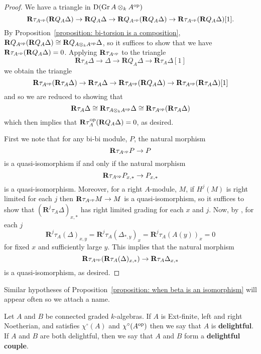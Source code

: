 \begin{proof}
  We have a triangle in \(\mathrm{D}(\operatorname{Gr}A \otimes_k A^{\operatorname{op}})\)
  \[\mathbf{R}\tau_{A^{\operatorname{op}}} (\mathbf{R}Q_A \Delta) \to \mathbf{R}Q_A \Delta \to \mathbf{R}Q_{A^{\operatorname{op}}} (\mathbf{R}Q_A \Delta) \to \mathbf{R}\tau_{A^{\operatorname{op}}} (\mathbf{R}Q_A \Delta)[1].\]
  By Proposition~\ref{proposition: bi-torsion is a composition}, \(\mathbf{R}Q_{A^{\operatorname{op}}}(\mathbf{R}Q_A \Delta) \cong \mathbf{R}Q_{A \otimes_k A^{\operatorname{op}}} \Delta\), so it suffices to show that we have \(\mathbf{R}\tau_{A^{\operatorname{op}}}(\mathbf{R}Q_A \Delta) = 0\).
  Applying \(\mathbf{R}\tau_{A^{\operatorname{op}}}\) to the triangle
  \[\mathbf{R}\tau_A \Delta \to \Delta \to \mathbf{R}Q_A \Delta \to \mathbf{R}\tau_A \Delta[1]\]
  we obtain the triangle
  \[\mathbf{R}\tau_{A^{\operatorname{op}}} (\mathbf{R}\tau_A \Delta) \to \mathbf{R}\tau_A \Delta \to \mathbf{R}\tau_{A^{\operatorname{op}}} (\mathbf{R}Q_A \Delta) \to \mathbf{R}\tau_{A^{\operatorname{op}}} (\mathbf{R}\tau_A \Delta)[1]\]
  and so we are reduced to showing that
  \[\mathbf{R}\tau_A \Delta \cong \mathbf{R}\tau_{A \otimes_k A^{\operatorname{op}}}\Delta \cong \mathbf{R}\tau_{A^{\operatorname{op}}} (\mathbf{R}\tau_A \Delta)\]
  which then implies that \(\mathbf{R}\tau_A^{\operatorname{op}}(\mathbf{R}Q_A \Delta) = 0\), as desired.

  First we note that for any bi-bi module, \(P\), the natural morphism
  \[\mathbf{R}\tau_{A^{\operatorname{op}}} P \to P\]
  is a quasi-isomorphism if and only if the natural morphism
  \[\mathbf{R}\tau_{A^{\operatorname{op}}} P_{x,\ast} \to P_{x,\ast}\]
  is a quasi-isomorphism.
  Moreover, for a right \(A\)-module, \(M\), if \(H^j(M)\) is right limited for each \(j\) then \(\mathbf{R} \tau_{A^{\operatorname{op}}} M \to M\) is a quasi-isomorphism,
  so it suffices to show that \((\mathbf{R}^j \tau_A \Delta)_{x,\ast}\) has right limited grading for each \(x\) and \(j\).
  Now, by \textcite[Cor. 3.6 (3)]{AZ94}, for each \(j\)
  \[\mathbf{R}^j\tau_A(\Delta)_{x,y} = \mathbf{R}^j\tau_A(\Delta_{\ast,y})_x = \mathbf{R}^j\tau_A(A(y))_x = 0\]
  for fixed \(x\) and sufficiently large \(y\).
  This implies that the natural morphism
  \[\mathbf{R}\tau_{A^{\operatorname{op}}}(\mathbf{R}\tau_A(\Delta)_{x,\ast}) \to \mathbf{R}\tau_A\Delta_{x,\ast}\]
  is a quasi-isomorphism, as desired.
\end{proof}

Similar hypotheses of Proposition~\ref{proposition: when beta is an isomorphism} will appear often so we attach a name. 

\begin{definition} \label{definition: delightful couple}
  Let \(A\) and \(B\) be connected graded \(k\)-algebras. If \(A\) is Ext-finite, left and right Noetherian, and satisfies \(\chi^\circ(A)\) and \(\chi^\circ(A^{\operatorname{op}})\) then we say that \(A\) is \textbf{delightful}. If \(A\) and \(B\) are both delightful, then we say that \(A\) and \(B\) form a \textbf{delightful couple}. 
\end{definition}
